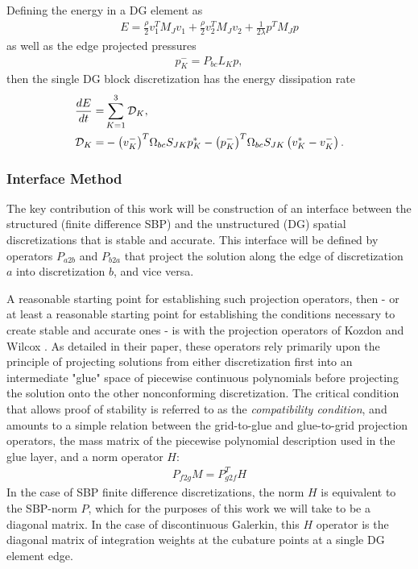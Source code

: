 Defining the energy in a DG element as
\begin{align}
  E =
  \frac{\rho}{2}v_{1}^{T}M_{J}v_{1}
  + \frac{\rho}{2}v_{2}^{T}M_{J}v_{2}
  + \frac{1}{2\lambda}p^{T}M_{J}p
\end{align}
as well as the edge projected pressures
\begin{align}
  p_{K}^{-} = P_{bc}L_{K} p,
\end{align}
then the single DG block discretization has the energy dissipation rate
\begin{align}
  \frac{dE}{dt} = & \sum_{K=1}^{3} \mathcal{D}_{K},\\
  \label{eqn:disp:edge:dg}
  \mathcal{D}_{K} = &
  - {\left(v_{K}^{-}\right)}^{T}\Omega_{bc}S_{JK}p_{K}^{*}
  - {\left(p_{K}^{-}\right)}^{T}\Omega_{bc}S_{JK}
  \left(v^{*}_{K} - v^{-}_{K}\right).
\end{align}

\subsubsection{Interface Method}

The key contribution of this work will be construction of an interface
between the structured (finite difference SBP) and the unstructured (DG)
spatial discretizations that is stable and accurate. This interface will
be defined by operators $P_{a2b}$ and $P_{b2a}$ that project the solution
along the edge of discretization $a$ into discretization $b$, and vice versa.

A reasonable starting point for establishing such projection operators, then - 
or at least a reasonable starting point for establishing the conditions necessary
to create stable and accurate ones - is with the projection operators of Kozdon
and Wilcox \cite{kozdon2016stable}. As detailed in their paper, these operators
rely primarily upon the principle of projecting solutions from either discretization
first into an intermediate "glue" space of piecewise continuous polynomials
before projecting the solution onto the other nonconforming discretization. The
critical condition that allows proof of stability is referred to as the
\emph{compatibility condition}, and amounts to a simple relation between the
grid-to-glue and glue-to-grid projection operators, the mass matrix of the
piecewise polynomial description used in the glue layer, and a norm operator
$H$:
\begin{align}
P_{f2g}M = P_{g2f}^{T}H
\end{align}
In the case of SBP finite difference discretizations, the norm $H$ is equivalent
to the SBP-norm $P$, which for the purposes of this work we will take to be
a diagonal matrix. In the case of discontinuous Galerkin, this $H$ operator is
the diagonal matrix of integration weights at the cubature points at a single
DG element edge.


